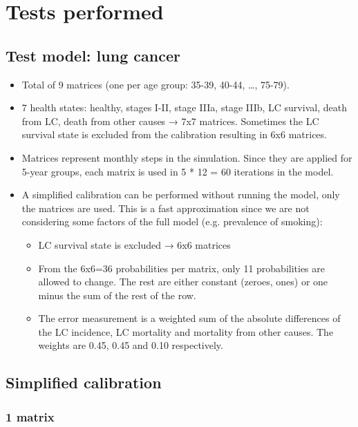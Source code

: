 \chapter{Tests performed} %

\label{sec:tests} %

\section{Test model: lung cancer}

\begin{itemize}
	\item Total of 9 matrices (one per age group: 35-39, 40-44, …, 75-79).
	\item 7 health states: healthy, stages I-II, stage IIIa, stage IIIb, LC survival, death from LC, death from other causes → 7x7 matrices. Sometimes the LC survival state is excluded from the calibration resulting in 6x6 matrices.
	\item Matrices represent monthly steps in the simulation. Since they are applied for 5-year groups, each matrix is used in 5 * 12 = 60 iterations in the model.
	\item A simplified calibration can be performed without running the model, only the matrices are used. This is a fast approximation since we are not considering some factors of the full model (e.g. prevalence of smoking):
	\begin{itemize}
		\item LC survival state is excluded → 6x6 matrices
		\item From the 6x6=36 probabilities per matrix, only 11 probabilities are allowed to change. The rest are either constant (zeroes, ones) or one minus the sum of the rest of the row.
		\item The error measurement is a weighted sum of the absolute differences of the LC incidence, LC mortality and mortality from other causes. The weights are 0.45, 0.45 and 0.10 respectively.
	\end{itemize}
\end{itemize}

\section{Simplified calibration}
\subsection{1 matrix}

